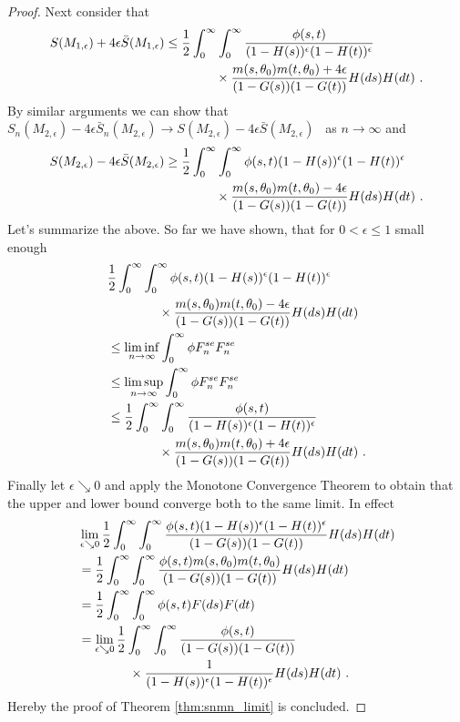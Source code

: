 \begin{thm}
\begin{proof}
		Next consider that 
		\begin{align*}
			S(M_{1,\epsilon}) + 4\epsilon \bar{S}(M_{1,\epsilon}) &\leq \frac{1}{2}\int_{0}^{\infty} \int_{0}^{\infty} \frac{\phi(s,t)}{(1-H(s))^\epsilon(1-H(t))^\epsilon}\\
			&\qquad\qquad \times \frac{m(s,\theta_0)m(t,\theta_0) + 4\epsilon}{(1-G(s))(1-G(t))} H(ds)H(dt)\textrm{ .}
		\end{align*}
		By similar arguments we can show that $S_n(M_{2,\epsilon}) - 4\epsilon \bar{S}_n(M_{2,\epsilon}) \to S(M_{2,\epsilon}) - 4\epsilon \bar{S}(M_{2,\epsilon})$ \wpo\ as $n\to\infty$ and 
		\begin{align*}
			S(M_{2,\epsilon}) - 4\epsilon \bar{S}(M_{2,\epsilon}) &\geq \frac{1}{2}\int_{0}^{\infty} \int_{0}^{\infty} \phi(s,t)(1-H(s))^\epsilon(1-H(t))^\epsilon\\
			&\qquad\qquad \times \frac{m(s,\theta_0)m(t,\theta_0) - 4\epsilon}{(1-G(s))(1-G(t))} H(ds)H(dt)\textrm{ .}
		\end{align*}
		Let's summarize the above. So far we have shown, that for $0<\epsilon\leq 1$ small enough
		\begin{align*}
			&\frac{1}{2}\int_{0}^{\infty} \int_{0}^{\infty} \phi(s,t)(1-H(s))^\epsilon(1-H(t))^\epsilon\\
			&\qquad\qquad \times \frac{m(s,\theta_0)m(t,\theta_0) - 4\epsilon}{(1-G(s))(1-G(t))} H(ds)H(dt)\\
			&\leq \liminf_{n\to\infty} \int_{0}^{\infty} \phi F_n^{se} F_n^{se}\\
			&\leq \limsup_{n\to\infty} \int_{0}^{\infty} \phi F_n^{se} F_n^{se}\\
			&\leq \frac{1}{2}\int_{0}^{\infty} \int_{0}^{\infty} \frac{\phi(s,t)}{(1-H(s))^\epsilon(1-H(t))^\epsilon}\\
			&\qquad\qquad \times \frac{m(s,\theta_0)m(t,\theta_0) + 4\epsilon}{(1-G(s))(1-G(t))} H(ds)H(dt)\textrm{ .}
		\end{align*}
		Finally let $\epsilon \searrow 0$ and apply the Monotone Convergence Theorem to obtain that the upper and lower bound converge both to the same limit. In effect
		\begin{align*}
			&\lim\limits_{\epsilon\searrow 0}\frac{1}{2}\int_{0}^{\infty} \int_{0}^{\infty} \frac{\phi(s,t)(1-H(s))^\epsilon(1-H(t))^\epsilon}{(1-G(s))(1-G(t))} H(ds)H(dt)\\
			&= \frac{1}{2}\int_{0}^{\infty} \int_{0}^{\infty} \frac{\phi(s,t)m(s,\theta_0)m(t,\theta_0)}{(1-G(s))(1-G(t))} H(ds)H(dt)\\
			&= \frac{1}{2}\int_{0}^{\infty} \int_{0}^{\infty} \phi(s,t)F(ds)F(dt)\\
			&= \lim\limits_{\epsilon\searrow 0} \frac{1}{2}\int_{0}^{\infty} \int_{0}^{\infty} \frac{\phi(s,t)}{(1-G(s))(1-G(t))}\\
			&\qquad\qquad \times \frac{1}{(1-H(s))^\epsilon(1-H(t))^\epsilon} H(ds)H(dt)\textrm{ .}
		\end{align*}
		Hereby the proof of Theorem \ref{thm:snmn_limit} is concluded. 
	\end{proof}
\end{thm}
